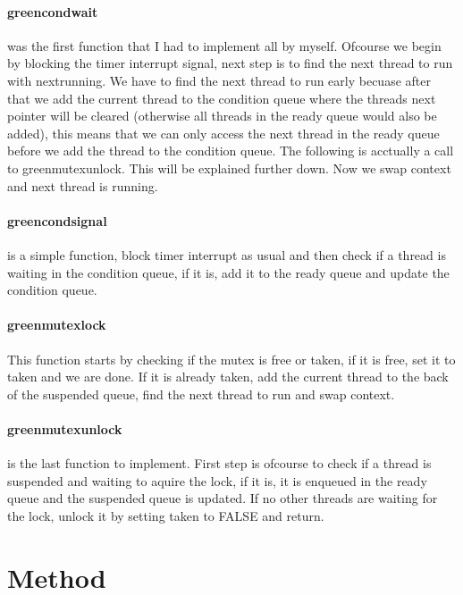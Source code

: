 \documentclass[11pt]{article}
\begin{document}
\paragraph{green\textunderscore cond\textunderscore wait}
was the first function that I had to implement all by myself. Ofcourse we begin by blocking the timer interrupt signal, next step is to find the next 
thread to run with next\textunderscore running. We have to find the next thread to run early becuase after that we add the current thread to the 
condition queue where the threads next pointer will be cleared (otherwise all threads in the ready queue would also be added), this means that
we can only access the next thread in the ready queue before we add the thread to the condition queue. The following is acctually a call to 
green\textunderscore mutex\textunderscore unlock. This will be explained further down. Now we swap context and next thread is running.

\paragraph{green\textunderscore cond\textunderscore signal}
is a simple function, block timer interrupt as usual and then check if a thread is waiting in the condition queue, if it is, add it to the ready queue
and update the condition queue. 

\paragraph{green\textunderscore mutex\textunderscore lock}
This function starts by checking if the mutex is free or taken, if it is free, set it to taken and we are done. If it is already taken, add the current
thread to the back of the suspended queue, find the next thread to run and swap context.

\paragraph{green\textunderscore mutex\textunderscore unlock}
is the last function to implement. First step is ofcourse to check if a thread is suspended and waiting to aquire the lock, if it is, it is enqueued
in the ready queue and the suspended queue is updated. If no other threads are waiting for the lock, unlock it by setting taken to FALSE and return.

\section{Method}
\end{document}
